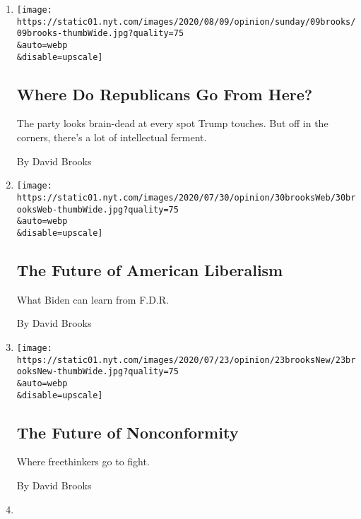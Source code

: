 \begin{enumerate}
\def\labelenumi{\arabic{enumi}.}
\item
  \href{/2020/08/07/opinion/sunday/republican-party-trump-2020.html}{}

  \texttt{[image: https://static01.nyt.com/images/2020/08/09/opinion/sunday/09brooks/09brooks-thumbWide.jpg?quality=75\\\&auto=webp\\\&disable=upscale]}

  \hypertarget{where-do-republicans-go-from-here}{%
  \subsection{Where Do Republicans Go From
  Here?}\label{where-do-republicans-go-from-here}}

  The party looks brain-dead at every spot Trump touches. But off in the
  corners, there's a lot of intellectual ferment.

  By David Brooks
\item
  \href{/2020/07/30/opinion/biden-fdr.html}{}

  \texttt{[image: https://static01.nyt.com/images/2020/07/30/opinion/30brooksWeb/30brooksWeb-thumbWide.jpg?quality=75\\\&auto=webp\\\&disable=upscale]}

  \hypertarget{the-future-of-american-liberalism}{%
  \subsection{The Future of American
  Liberalism}\label{the-future-of-american-liberalism}}

  What Biden can learn from F.D.R.

  By David Brooks
\item
  \href{/2020/07/23/opinion/substack-newsletters-writers.html}{}

  \texttt{[image: https://static01.nyt.com/images/2020/07/23/opinion/23brooksNew/23brooksNew-thumbWide.jpg?quality=75\\\&auto=webp\\\&disable=upscale]}

  \hypertarget{the-future-of-nonconformity}{%
  \subsection{The Future of
  Nonconformity}\label{the-future-of-nonconformity}}

  Where freethinkers go to fight.

  By David Brooks
\item
  \href{/2020/07/16/opinion/biden-2020.html}{}


\end{enumerate}
